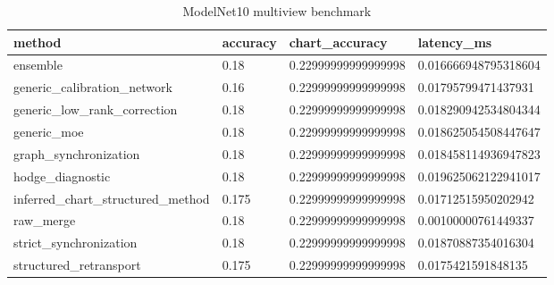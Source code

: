 \begin{table}[t]
\centering
\caption{ModelNet10 multiview benchmark}
\begin{tabular}{llll}
\toprule
method & accuracy & chart\_accuracy & latency\_ms \\
\midrule
ensemble & 0.18 & 0.22999999999999998 & 0.016666948795318604 \\
generic\_calibration\_network & 0.16 & 0.22999999999999998 & 0.01795799471437931 \\
generic\_low\_rank\_correction & 0.18 & 0.22999999999999998 & 0.018290942534804344 \\
generic\_moe & 0.18 & 0.22999999999999998 & 0.018625054508447647 \\
graph\_synchronization & 0.18 & 0.22999999999999998 & 0.018458114936947823 \\
hodge\_diagnostic & 0.18 & 0.22999999999999998 & 0.019625062122941017 \\
inferred\_chart\_structured\_method & 0.175 & 0.22999999999999998 & 0.01712515950202942 \\
raw\_merge & 0.18 & 0.22999999999999998 & 0.00100000761449337 \\
strict\_synchronization & 0.18 & 0.22999999999999998 & 0.01870887354016304 \\
structured\_retransport & 0.175 & 0.22999999999999998 & 0.0175421591848135 \\
\bottomrule
\end{tabular}
\end{table}
